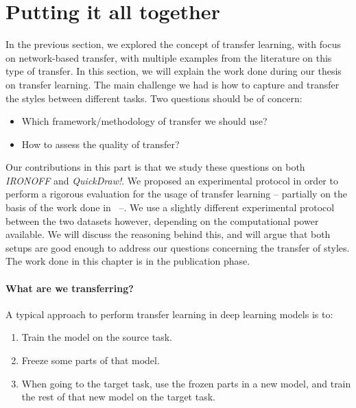 \section{Putting it all together}
  \par In the previous section, we explored the concept of transfer learning, with focus on network-based transfer, with multiple examples from the literature on this type of transfer. In this section, we will explain the work done during our thesis on transfer learning. The main challenge we had is how to capture and transfer the styles between different tasks. Two questions should be of concern:
  \begin{itemize}
    \item Which framework/methodology of transfer we should use?
    \item How to assess the quality of transfer?
  \end{itemize}

  \par Our contributions in this part is that we study these questions on both \textit{IRONOFF} and \textit{QuickDraw!}. We proposed an experimental protocol in order to perform a rigorous evaluation for the usage of transfer learning -- partially on the basis of the work done in~\citep{8686063} --. We use a slightly different experimental protocol between the two datasets however, depending on the computational power available. We will discuss the reasoning behind this, and will argue that both setups are good enough to address our questions concerning the transfer of styles. The work done in this chapter is in the publication phase.


  \paragraph{What are we transferring?} A typical approach to perform transfer learning in deep learning models is to:
    \begin{enumerate}
      \item Train the model on the source task.
      \item Freeze some parts of that model.
      \item When going to the target task, use the frozen parts in a new model, and train the rest of that new model on the target task.
    \end{enumerate}

